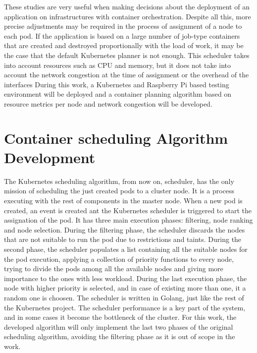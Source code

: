 \documentclass[conference]{IEEEtran}
\begin{document}
These studies are very useful when making decisions about the deployment of an application on infrastructures with container orchestration.
Despite all this, more precise adjustments may be required in the process of assignment of a node to each pod. If the application is based on a large number of
job-type containers that are created and destroyed proportionally with the load of work, it may be the case that the default Kubernetes planner is not
enough. This scheduler takes into account resources such as CPU and memory, but it does not take into account the network congestion at the time of assignment 
or the overhead of the interfaces During this work, a Kubernetes and Raspberry Pi based testing environment will be deployed and a container planning algorithm
based on resource metrics per node and network congestion will be developed.



\section{Container scheduling Algorithm Development}\label{sec:alg}



The Kubernetes scheduling algorithm, from now on, scheduler, has the only mission of scheduling
the just created pods to a cluster node. It is a process executing with the rest of components
in the master node. When a new pod is created, an event is created ant the Kubernetes scheduler is 
triggered to start the assignation of the pod. It has three main execution phases: filtering,
node ranking and node selection. During the filtering phase, the scheduler discards the nodes
that are not suitable to run the pod due to restrictions and taints. During the second phase, 
the scheduler populates a list containing all the suitable nodes for the pod execution, applying
a collection of priority functions to every node, trying to divide the pods among all the
available nodes and giving more importance to the ones with less workload. During the last execution
phase, the node with higher priority is selected, and in case of existing more than one, it a random 
one is choosen. 
The scheduler is written in Golang, just like the rest of the Kubernetes project. The scheduler
performance is a key part of the system, and in some cases it become the bottleneck of the cluster.
For this work, the developed algorithm will only implement the last two phases of the original
scheduling algorithm, avoiding the filtering phase as it is out of scope in the work.
\end{document}
